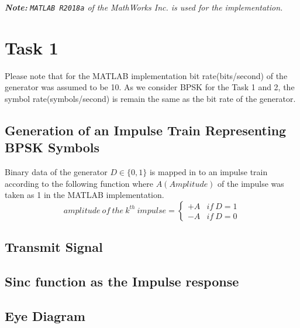 \documentclass[a4paper,11pt]{article}%
\begin{document}


\tableofcontents
\listoffigures
\listoftables
\vfill


\begin{center}
	\textit{\textbf{Note:}}
\textit{{\tt MATLAB R2018a} of the MathWorks Inc. is used for the implementation.}
\end{center}
\pagebreak

\section{Task 1}

Please note that for the MATLAB implementation bit rate(bits/second) of the generator was assumed to be 10. As we consider BPSK for the Task 1 and 2, the symbol rate(symbols/second) is remain the same as the bit rate of the generator.

\subsection{Generation of an Impulse Train Representing BPSK Symbols}
Binary data of the generator $D \in \{0, 1\}$ is mapped in to an impulse train according to the following function where $A(Amplitude)$  of the impulse was taken as 1 in the MATLAB implementation.
\[
amplitude ~of~ the~ k^{th}~ impulse = \begin{cases}
	+A & if~ D = 1\\
	-A & if~ D = 0
\end{cases}
\]

\subsection{Transmit Signal}
\subsection{Sinc function as the Impulse response}
\subsection{Eye Diagram}


\end{document}
